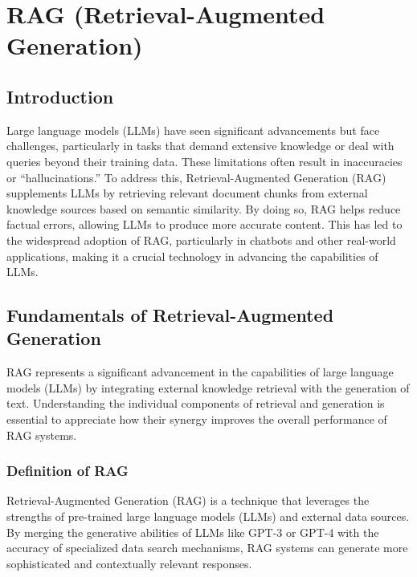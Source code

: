 \chapter{RAG (Retrieval-Augmented Generation)}
\pagestyle{fancy}
\pagestyle{fancy}\chead{} \pagestyle{fancy}\rhead{}
\pagestyle{fancy} 
\pagestyle{fancy}\cfoot{} \pagestyle{fancy}\rfoot{\thepage}
\section{ Introduction}\label{start2}

Large language models (LLMs) have seen significant advancements but face challenges, particularly in tasks that demand extensive knowledge or deal with queries beyond their training data. These limitations often result in inaccuracies or “hallucinations.” To address this, Retrieval-Augmented Generation (RAG) supplements LLMs by retrieving relevant document chunks from external knowledge sources based on semantic similarity. By doing so, RAG helps reduce factual errors, allowing LLMs to produce more accurate content. This has led to the widespread adoption of RAG, particularly in chatbots and other real-world applications, making it a crucial technology in advancing the capabilities of LLMs.
\section{Fundamentals of Retrieval-Augmented Generation}
RAG represents a significant advancement in the capabilities of large language models (LLMs) by integrating external knowledge retrieval with the generation of text. Understanding the individual components of retrieval and generation is essential to appreciate how their synergy improves the overall performance of RAG systems.
\subsection{Definition of RAG}
Retrieval-Augmented Generation (RAG) is a technique that leverages the strengths of pre-trained large language models (LLMs) and external data sources. By merging the generative abilities of LLMs like GPT-3 or GPT-4 with the accuracy of specialized data search mechanisms, RAG systems can generate more sophisticated and contextually relevant responses\cite{selvaraj2024}.
